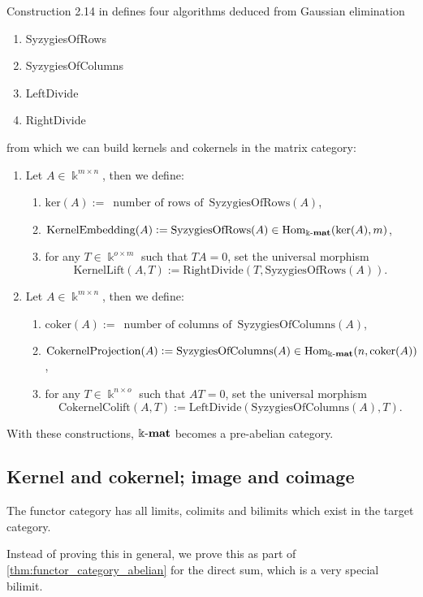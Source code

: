 \begin{example}
Construction 2.14 in \cite{[Posur]} defines four algorithms deduced from Gaussian elimination
\begin{enumerate}
\renewcommand{\labelenumi}{(\theenumi)}
\item SyzygiesOfRows
\item SyzygiesOfColumns
\item LeftDivide
\item RightDivide
\end{enumerate}
from which we can build kernels and cokernels in the matrix category:
\begin{enumerate}
\renewcommand{\labelenumi}{(\theenumi)}
\item Let $A \in \Bbbk^{m\times n}$, then we define:
\begin{enumerate}
\renewcommand{\labelenumii}{(\alph{enumii})}
\item $\mathrm{ker}(A) :=\,\text{ number of rows of }\,\mathrm{SyzygiesOfRows}(A)$,
\item $\mathrm{KernelEmbedding}(A) := \mathrm{SyzygiesOfRows}(A) \in \mathrm{Hom}_{\Bbbk\textnormal{-}\mathbf{mat}}(\mathrm{ker}(A), m)$,
\item for any $T \in \Bbbk^{o\times m}$ such that $TA = 0$, set the universal morphism
\[
\mathrm{KernelLift}(A,T) := \mathrm{RightDivide}(T, \mathrm{SyzygiesOfRows}(A)).
\]
\end{enumerate}
\item Let $A \in \Bbbk^{m\times n}$, then we define:
\begin{enumerate}
\renewcommand{\labelenumii}{(\alph{enumii})}
\item $\mathrm{coker}(A) :=\,\text{ number of columns of }\,\mathrm{SyzygiesOfColumns}(A)$,
\item $\mathrm{CokernelProjection}(A) := \mathrm{SyzygiesOfColumns}(A) \in \mathrm{Hom}_{\Bbbk\textnormal{-}\mathbf{mat}}(n, \mathrm{coker}(A))$,
\item for any $T \in \Bbbk^{n\times o}$ such that $AT = 0$, set the universal morphism
\[
\mathrm{CokernelColift}(A,T) := \mathrm{LeftDivide}(\mathrm{SyzygiesOfColumns}(A), T).
\]
\end{enumerate}
\end{enumerate}
With these constructions, $\Bbbk\textnormal{-}\mathbf{mat}$ becomes a pre-abelian category.
\end{example}


\subsection{Kernel and cokernel; image and coimage}





\begin{theorem}
The functor category has all limits, colimits and bilimits which exist in the target category.
\end{theorem}

Instead of proving this in general, we prove this as part of \ref{thm:functor_category_abelian} for the direct sum, which is a very special bilimit.

